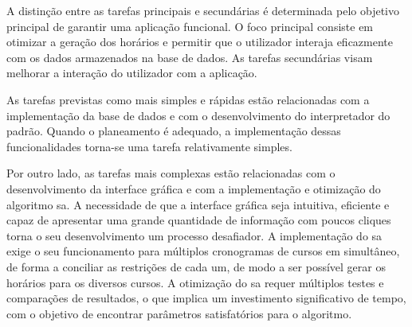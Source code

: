 A distinção entre as tarefas principais e secundárias é determinada pelo objetivo principal de garantir uma aplicação funcional. O foco principal consiste em otimizar a geração dos horários e permitir que o utilizador interaja eficazmente com os dados armazenados na base de dados. As tarefas secundárias visam melhorar a interação do utilizador com a aplicação.

As tarefas previstas como mais simples e rápidas estão relacionadas com a implementação da base de dados e com o desenvolvimento do interpretador do padrão. Quando o planeamento é adequado, a implementação dessas funcionalidades torna-se uma tarefa relativamente simples.

Por outro lado, as tarefas mais complexas estão relacionadas com o desenvolvimento da interface gráfica e com a implementação e otimização do algoritmo \gls{sa}. A necessidade de que a interface gráfica seja intuitiva, eficiente e capaz de apresentar uma grande quantidade de informação com poucos cliques torna o seu desenvolvimento um processo desafiador. A implementação do \gls{sa} exige o seu funcionamento para múltiplos cronogramas de cursos em simultâneo, de forma a conciliar as restrições de cada um, de modo a ser possível gerar os horários para os diversos cursos. A otimização do \gls{sa} requer múltiplos testes e comparações de resultados, o que implica um investimento significativo de tempo, com o objetivo de encontrar parâmetros satisfatórios para o algoritmo.